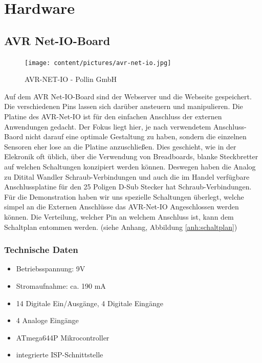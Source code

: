 
\chapter{Hardware}
\section{AVR Net-IO-Board}
\begin{figure}[h]
\centering
\texttt{[image: content/pictures/avr-net-io.jpg]}
\caption{AVR-NET-IO - Pollin GmbH}
\label{fig:B3}
\end{figure}

Auf dem AVR Net-IO-Board sind der Webserver und die Webseite gespeichert. Die
verschiedenen Pins lassen sich darüber ansteuern und manipulieren.
Die Platine des AVR-Net-IO ist für den einfachen Anschluss der externen
Anwendungen gedacht. Der Fokus liegt hier, je nach verwendetem Anschluss-Baord
nicht darauf eine optimale Gestaltung zu haben, sondern die einzelnen Sensoren
eher lose an die Platine anzuschließen. Dies geschieht, wie in der Elekronik oft
üblich, über die Verwendung von Breadboards, blanke Steckbretter auf
welchen Schaltungen konzipiert werden können. Deswegen haben die Analog zu Ditital
Wandler Schraub-Verbindungen und auch die im Handel verfügbare Anschlussplatine
für den 25 Poligen D-Sub Stecker hat Schraub-Verbindungen. Für die Demonstration
haben wir uns spezielle Schaltungen überlegt, welche simpel an die Externen
Anschlüsse das AVR-Net-IO Angeschlossen werden können. Die Verteilung, welcher
Pin an welchem Anschluss ist, kann dem Schaltplan entommen werden. (siehe
Anhang, Abbildung \ref{anh:schaltplan})

\subsection{Technische Daten}
\begin{itemize}
  \item Betriebsspannung: 9V 
  \item Stromaufnahme: ca. 190 mA
  \item 14 Digitale Ein/Ausgänge, 4 Digitale Eingänge
  \item 4 Analoge Eingänge
  \item ATmega644P Mikrocontroller
  \item integrierte ISP-Schnittstelle
\end{itemize}

